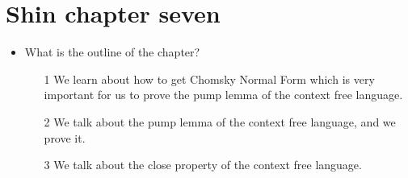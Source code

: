 \documentclass[../main.tex]{subfiles}
\begin{document}
\section{Shin chapter seven}
\label{sec:Shin chapter seven}
\begin{itemize}
\item What is the outline of the chapter? 
	\begin{itemize}
		\item [1] We learn about how to get Chomsky Normal Form
		which is very important for us to
		prove the pump lemma of the 
		context free language. 
		\item [2] We talk about the pump lemma of the 
		context free language, and we prove it. 
		\item [3] We talk about the close property of 
		the context free language. 
	\end{itemize}

\end{itemize}
\end{document}

